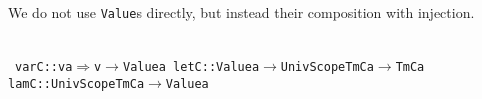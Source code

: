 \documentclass[9pt,authoryear]{sigplanconf}
\begin{document}
%
We do not use \texttt{Value}s directly, but instead their composition with injection.%


{\nopagebreak }

%
%
%
~\\~\vphantom{$\{$}\texttt{varC}\texttt{\mbox{\hspace{0.50em}}}\texttt{{:}{:}}\texttt{\mbox{\hspace{0.50em}}}\texttt{\makebox[1.22ex][l]{$ {(} $}}\texttt{v}\texttt{\mbox{\hspace{0.50em}}}\texttt{\makebox[1.22ex][c]{$ \in $}}\texttt{\mbox{\hspace{0.50em}}}\texttt{a}\texttt{\makebox[1.22ex][r]{$ {)} $}}\texttt{\mbox{\hspace{0.50em}}}\texttt{$ \Rightarrow $}\texttt{\mbox{\hspace{0.50em}}}\texttt{v}\texttt{\mbox{\hspace{0.50em}}}\texttt{$ \rightarrow $}\texttt{\mbox{\hspace{0.50em}}}\texttt{Value}\texttt{\mbox{\hspace{0.50em}}}\texttt{a}\texttt{{\nopagebreak \newline%
}\vphantom{$\{$}}\texttt{letC}\texttt{\mbox{\hspace{0.50em}}}\texttt{{:}{:}}\texttt{\mbox{\hspace{0.50em}}}\texttt{Value}\texttt{\mbox{\hspace{0.50em}}}\texttt{a}\texttt{\mbox{\hspace{0.50em}}}\texttt{$ \rightarrow $}\texttt{\mbox{\hspace{0.50em}}}\texttt{UnivScope}\texttt{\mbox{\hspace{0.50em}}}\texttt{TmC}\texttt{\mbox{\hspace{0.50em}}}\texttt{a}\texttt{\mbox{\hspace{0.50em}}}\texttt{$ \rightarrow $}\texttt{\mbox{\hspace{0.50em}}}\texttt{TmC}\texttt{\mbox{\hspace{0.50em}}}\texttt{a}\texttt{{\nopagebreak \newline%
}\vphantom{$\{$}}\texttt{lamC}\texttt{\mbox{\hspace{0.50em}}}\texttt{{:}{:}}\texttt{\mbox{\hspace{0.50em}}}\texttt{UnivScope}\texttt{\mbox{\hspace{0.50em}}}\texttt{TmC}\texttt{\mbox{\hspace{0.50em}}}\texttt{a}\texttt{\mbox{\hspace{0.50em}}}\texttt{$ \rightarrow $}\texttt{\mbox{\hspace{0.50em}}}\texttt{Value}\texttt{\mbox{\hspace{0.50em}}}\texttt{a}\texttt{{\nopagebreak \newline%
}}
\end{document}
